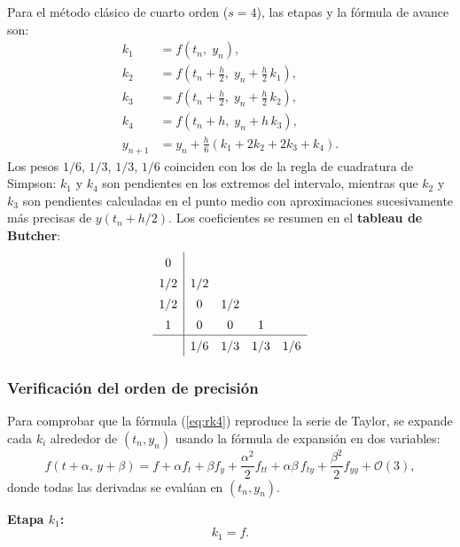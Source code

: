 \documentclass[10pt,onecolumn]{article}
\begin{document}
Para el método clásico de cuarto orden ($s=4$), las etapas y la fórmula de avance son:
\begin{align}
    k_1 &= f(t_n,\; y_n), \label{eq:k1}\\
    k_2 &= f\!\left(t_n + \tfrac{h}{2},\; y_n + \tfrac{h}{2}\,k_1\right), \label{eq:k2}\\
    k_3 &= f\!\left(t_n + \tfrac{h}{2},\; y_n + \tfrac{h}{2}\,k_2\right), \label{eq:k3}\\
    k_4 &= f\!\left(t_n + h,\; y_n + h\,k_3\right), \label{eq:k4}\\[4pt]
    y_{n+1} &= y_n + \frac{h}{6}\left(k_1 + 2k_2 + 2k_3 + k_4\right). \label{eq:rk4}
\end{align}
Los pesos $1/6$, $1/3$, $1/3$, $1/6$ coinciden con los de la regla de cuadratura de Simpson: $k_1$ y $k_4$ son pendientes en los extremos del intervalo, mientras que $k_2$ y $k_3$ son pendientes calculadas en el punto medio con aproximaciones sucesivamente más precisas de $y(t_n+h/2)$. Los coeficientes se resumen en el \textbf{tableau de Butcher}:
\begin{equation}
\renewcommand\arraystretch{1.4}
\begin{array}{c|cccc}
0   &     &     &     &     \\
1/2 & 1/2 &     &     &     \\
1/2 &  0  & 1/2 &     &     \\
1   &  0  &  0  &  1  &     \\
\hline
    & 1/6 & 1/3 & 1/3 & 1/6
\end{array}
\end{equation}

\subsubsection*{Verificación del orden de precisión}

Para comprobar que la fórmula (\ref{eq:rk4}) reproduce la serie de Taylor, se expande cada $k_i$ alrededor de $(t_n, y_n)$ usando la fórmula de expansión en dos variables:
\begin{equation}
    f(t+\alpha,\, y+\beta) = f + \alpha f_t + \beta f_y + \frac{\alpha^2}{2}f_{tt} + \alpha\beta\, f_{ty} + \frac{\beta^2}{2}f_{yy} + \mathcal{O}(3),
\end{equation}
donde todas las derivadas se evalúan en $(t_n, y_n)$.

\medskip\noindent
\textbf{Etapa $k_1$:}
\begin{equation}
    k_1 = f.
\end{equation}
\end{document}
